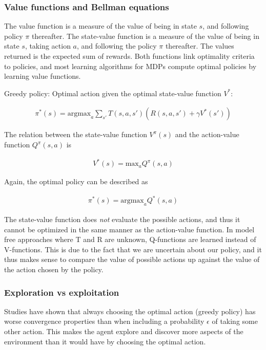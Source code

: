 \subsubsection{Value functions and Bellman equations}

The value function is a measure of the value of being in state $s$, and following policy $\pi$ thereafter. The state-value function is a measure of the value of being in state $s$, taking action $a$, and following the policy $\pi$ thereafter. The values returned is the expected sum of rewards. Both functions link optimality criteria to policies, and most learning algorithms for MDPs compute optimal policies by learning value functions.

Greedy policy: Optimal action given the optimal state-value function $V^*$:

\begin{align}
    \pi^*(s) = \text{argmax}_a \sum_{s'} T(s, a, s')(R(s, a, s') + \gamma V^*(s'))
\end{align}

The relation between the state-value function $V^{\pi}(s)$ and the action-value function
$Q^{\pi}(s, a)$ is 

\begin{align}
    V^*(s) = \text{max}_a Q^{\pi}(s, a)
\end{align}

Again, the optimal policy can be described as

\begin{align}
    \pi^*(s) = \text{argmax}_a Q^{*}(s, a)
\end{align}

The state-value function does \textit{not} evaluate the possible actions,
and thus it cannot be optimized in the same manner as the action-value function. In model free approaches where T and R are unknown, Q-functions are learned instead of V-functions. This is due to the fact that we are uncertain about our policy, and it thus makes sense to compare the value of possible actions up against the value of the action chosen by the policy.

\subsubsection{Exploration vs exploitation}

Studies have shown that always choosing the optimal action (greedy policy) has worse convergence properties than when including a probability $\epsilon$ of taking some other action. This makes the agent explore and discover more aspects of the environment than it would have by choosing the optimal action. 





